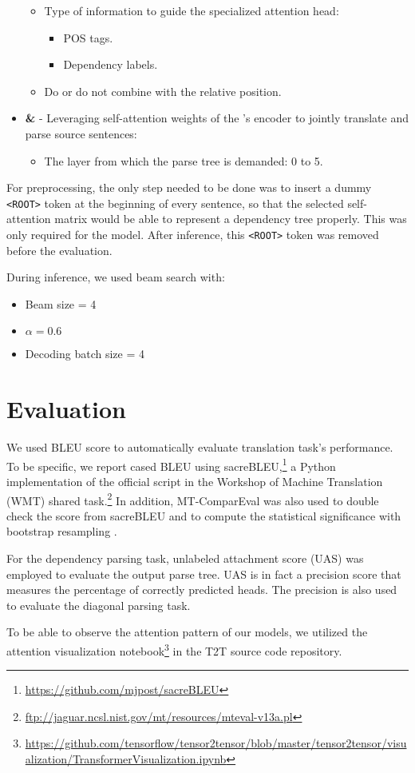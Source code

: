 \begin{itemize}
\begin{itemize}
            \item Type of information to guide the specialized attention head:
                \begin{itemize}
                    \item POS tags.
                    \item Dependency labels.
                \end{itemize}
            \item Do or do not combine with the relative position.
        \end{itemize}
    \item \textbf{\DepParse \& \DiagonalParse} - Leveraging self-attention weights of the \transformer's encoder to jointly translate and parse source sentences:
        \begin{itemize}
            \item The layer from which the parse tree is demanded: 0 to 5.
        \end{itemize}
\end{itemize}

For preprocessing, the only step needed to be done was to insert a dummy \texttt{<ROOT>} token at the beginning of every sentence, so that the selected self-attention matrix would be able to represent a dependency tree properly.
This was only required for the \DepParse model.
After inference, this \texttt{<ROOT>} token was removed before the evaluation.

During inference, we used beam search with:
\begin{itemize}
    \item Beam size = 4
    \item $\alpha = 0.6$
    \item Decoding batch size = 4
\end{itemize}

\section{Evaluation}
\label{dataexp-eval}

We used BLEU score to automatically evaluate translation task's performance.
To be specific, we report cased BLEU using sacreBLEU,\footnote{\url{https://github.com/mjpost/sacreBLEU}} a Python implementation of the official script in the Workshop of Machine Translation (WMT) shared task.\footnote{\url{ftp://jaguar.ncsl.nist.gov/mt/resources/mteval-v13a.pl}}
In addition, MT-ComparEval \citep{klejch2015mt} was also used to double check the score from sacreBLEU and to compute the statistical significance with bootstrap resampling \citep{koehn2004statistical}.

For the dependency parsing task, unlabeled attachment score (UAS) was employed to evaluate the output parse tree.
UAS is in fact a precision score that measures the percentage of correctly predicted heads.
The precision is also used to evaluate the diagonal parsing task.

To be able to observe the attention pattern of our models, we utilized the attention visualization notebook\footnote{\url{https://github.com/tensorflow/tensor2tensor/blob/master/tensor2tensor/visualization/TransformerVisualization.ipynb}} in the T2T source code repository.
